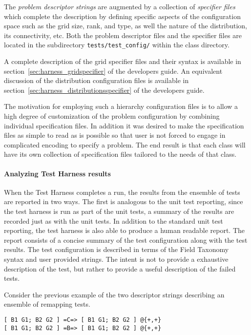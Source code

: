 The \textit{problem descriptor strings} are augmented by a collection of 
\textit{specifier files} which complete the  description by defining specific 
aspects of the configuration space such as the grid size, rank, and type, as well
the nature of the distribution, its connectivity, etc. Both the problem descriptor
files and the specifier files are located in the subdirectory 
\texttt{tests/test\_config/} within the class directory.

A complete description of the grid specifier files and their syntax is available
in section~\ref{sec:harness_gridspecifier} of the developers guide. An equivalent 
discussion of the distribution configuration files is available in 
section~\ref{sec:harness_distributionsspecifier} of the developers guide.

The motivation for employing such a hierarchy configuration files is to allow a 
high degree of customization of the problem configuration by combining individual 
specification files. In addition it was desired to make the specification files 
as simple to read as is possible so that user is not forced to engage in complicated 
encoding to specify a problem. The end result is that each class will have its own 
collection of specification files tailored to the needs of that class.

\paragraph{Analyzing Test Harness results }
When the Test Harness completes a run, the results from the ensemble of tests are
reported in two ways. The first is analogous to the unit test reporting, since the
test harness is run as part of the unit tests, a summary of the results are recorded 
just as with the unit tests. In addition to the standard unit test reporting, the
test harness is also able to produce a human readable report. The report consists 
of a concise summary of the test configuration along with the test results. The test 
configuration is described in terms of the Field Taxonomy syntax and user provided 
strings. The intent is not to provide a exhaustive description of the test, but 
rather to provide a useful description of the failed tests.

Consider the previous example of the two descriptor strings describing an ensemble 
of remapping tests. 

\begin{center}
\begin{verbatim}
[ B1 G1; B2 G2 ] =C=> [ B1 G1; B2 G2 ] @{+,+}
[ B1 G1; B2 G2 ] =B=> [ B1 G1; B2 G2 ] @{+,+} 
\end{verbatim}
\end{center}

